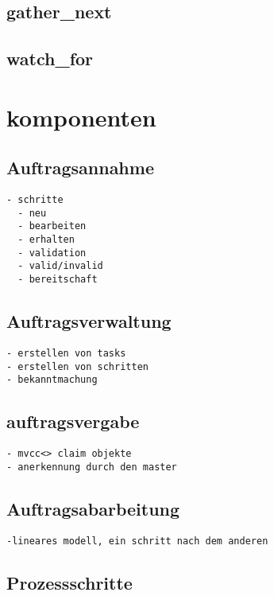 \subsection{gather\_next}
\subsection{watch\_for}

\section{komponenten}

\subsection{Auftragsannahme}

\begin{verbatim}
- schritte
  - neu
  - bearbeiten
  - erhalten
  - validation
  - valid/invalid
  - bereitschaft
\end{verbatim}

\subsection{Auftragsverwaltung}

\begin{verbatim}
- erstellen von tasks
- erstellen von schritten
- bekanntmachung
\end{verbatim}

\subsection{auftragsvergabe}

\begin{verbatim}
- mvcc<> claim objekte
- anerkennung durch den master

\end{verbatim}

\subsection{Auftragsabarbeitung}
\begin{verbatim}
-lineares modell, ein schritt nach dem anderen
\end{verbatim}

\subsection{Prozessschritte}


